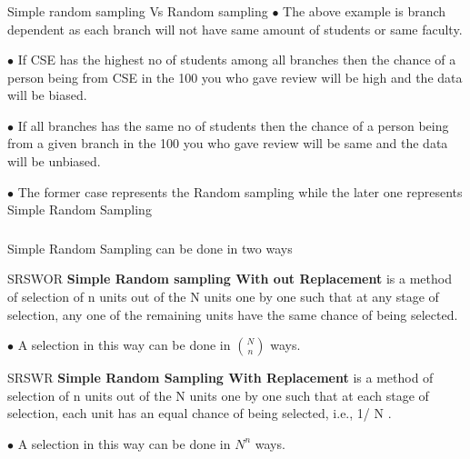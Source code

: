 \documentclass{beamer}
\begin{document}
\begin{frame}
\frametitle{}
\begin{block}{Simple random sampling Vs Random sampling}
$\bullet$ The above example is branch dependent as each branch will not have same amount of students or same faculty.

$\bullet$ If CSE has the highest no of students among all branches then the chance of a person being from CSE in the 100 you who gave review will be high and the data will be biased.

$\bullet$ If all branches has the same no of students then the chance of a person being from a given branch in the 100 you who gave review will be same  and the data will be unbiased.

$\bullet$ The former case represents the Random sampling while the later one represents Simple Random Sampling
\end{block}
\end{frame}

\begin{frame}
\frametitle{}
Simple Random Sampling can be done in two ways
\begin{block}{SRSWOR}
\textbf{Simple Random sampling With out Replacement} is a method of selection of n units out of the N units one by one such that at any stage of selection, any one of the remaining units have the same chance of being selected.

$\bullet$ A selection in this way can be done in $\binom{N}{n}$ ways.
 
\end{block}

\begin{block}{SRSWR}
\textbf{Simple Random Sampling With Replacement} is a method of selection of n units out of the N units one by one such that at each stage of selection, each unit has an equal chance of being selected, i.e., 1/ N .

$\bullet$ A selection in this way can be done in $N^n$ ways. 
\end{block}
\end{frame}
\end{document}
